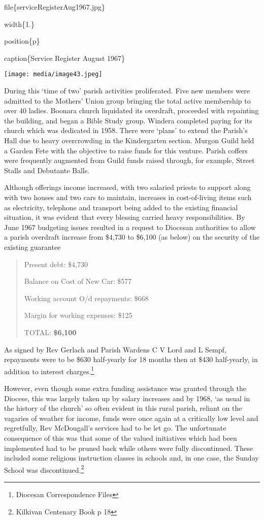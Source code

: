 file\{serviceRegisterAug1967.jpg\}

width\{1.\}

position\{p\}

caption\{Service Register August 1967\}

\texttt{[image: media/image43.jpeg]}

During this `time of two' parish activities proliferated. Five new members were admitted to the Mothers' Union group bringing the total active membership to over 40 ladies. Boonara church liquidated its overdraft, proceeded with repainting the building, and began a Bible Study group. Windera completed paying for its church which was dedicated in 1958. There were `plans' to extend the Parish's Hall due to heavy overcrowding in the Kindergarten section. Murgon Guild held a Garden Fete with the objective to raise funds for this venture. Parish coffers were frequently augmented from Guild funds raised through, for example, Street Stalls and Debutante Balls.

Although offerings income increased, with two salaried priests to support along with two houses and two cars to maintain, increases in cost-of-living items such as electricity, telephone and transport being added to the existing financial situation, it was evident that every blessing carried heavy responsibilities. By June 1967 budgeting issues resulted in a request to Diocesan authorities to allow a parish overdraft increase from \$4,730 to \$6,100 (as below) on the security of the existing guarantee

\begin{quote}
Present debt: \$4,730

Balance on Cost of New Car: \$577

Working account O/d repayments: \$668

Margin for working expenses: \$125

TOTAL: \textbf{\$6,100}
\end{quote}

As signed by Rev Gerlach and Parish Wardens C V Lord and L Sempf, repayments were to be \$630 half-yearly for 18 months then at \$430 half-yearly, in addition to interest charges.\footnote{Diocesan Correspondence Files}

However, even though some extra funding assistance was granted through the Diocese, this was largely taken up by salary increases and by 1968, `as usual in the history of the church' so often evident in this rural parish, reliant on the vagaries of weather for income, funds were once again at a critically low level and regretfully, Rev McDougall's services had to be let go. The unfortunate consequence of this was that some of the valued initiatives which had been implemented had to be pruned back while others were fully discontinued. These included some religious instruction classes in schools and, in one case, the Sunday School was discontinued.\footnote{Kilkivan Centenary Book p 18}

